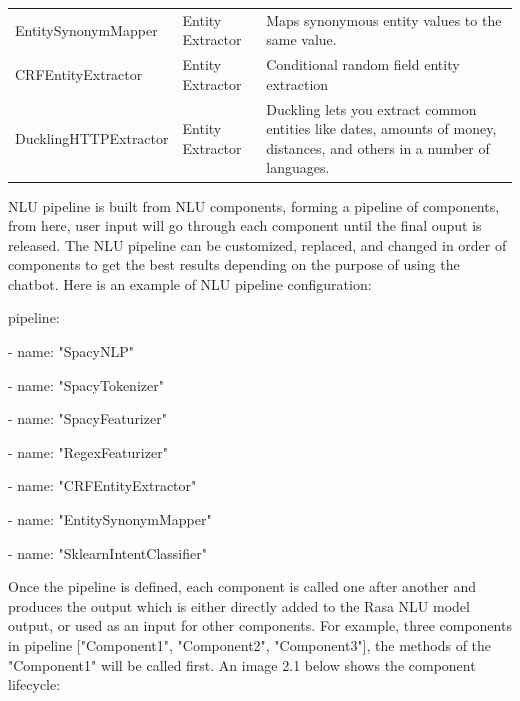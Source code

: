 \begin{table}
\begin{tabular}{p{5cm}|p{4cm}|p{8cm}}
EntitySynonymMapper                                        & Entity Extractor      & Maps synonymous entity values to the same value.                                                                         \\
CRFEntityExtractor                                                     & Entity Extractor      & Conditional random field entity extraction                                                                               \\
DucklingHTTPExtractor                                                  & Entity Extractor      & Duckling lets you extract common entities like dates, amounts of money, distances, and others in a number of languages. 
\end{tabular}
\label{tab:rasacomponent}
\end{table}


NLU pipeline is built from NLU components, forming a pipeline of components, from here, user input will go through each component until the final ouput is released.
The NLU pipeline can be customized, replaced, and changed in order of components to get the best results depending on the purpose of using the chatbot.
Here is an example of NLU pipeline configuration:

\quad pipeline:

\qquad - name: "SpacyNLP"

\qquad - name: "SpacyTokenizer"

\qquad - name: "SpacyFeaturizer"

\qquad - name: "RegexFeaturizer"

\qquad - name: "CRFEntityExtractor"

\qquad - name: "EntitySynonymMapper"

\qquad - name: "SklearnIntentClassifier" 

Once the pipeline is defined, each component is called one after another and produces the output which is either directly added to the Rasa NLU model output, or used as an input for other components. For example,  three components in pipeline ["Component1", "Component2", "Component3"], the methods of the "Component1" will be called first. An image 2.1 below shows the component lifecycle:

